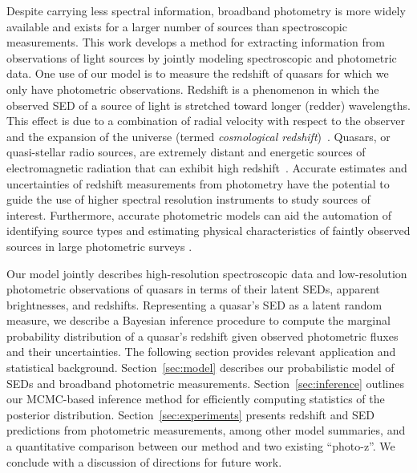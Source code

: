 \documentclass{article} %
\begin{document}
Despite carrying less spectral information, broadband photometry is more widely available and exists for a larger number of sources than spectroscopic measurements. 
This work develops a method for extracting information from observations of light sources by jointly modeling spectroscopic and photometric data.  
One use of our model is to measure the redshift of quasars for which we only have photometric observations.  
Redshift is a phenomenon in which the observed SED of a source of light is stretched toward longer (redder) wavelengths.
This effect is due to a combination of radial velocity with respect to the observer and the expansion of the universe (termed \emph{cosmological redshift})~\cite{hogg1999distance, harrison1993redshift}.  
Quasars, or quasi-stellar radio sources, are extremely distant and energetic sources of electromagnetic radiation that can exhibit high redshift~\cite{silk1997quasars}.  
Accurate estimates and uncertainties of redshift measurements from photometry have the potential to guide the use of higher spectral resolution instruments to study sources of interest.  
Furthermore, accurate photometric models can aid the automation of identifying source types and estimating physical characteristics of faintly observed sources in large photometric surveys \cite{regier2015}.  

Our model jointly describes high-resolution spectroscopic data and low-resolution photometric observations of quasars in terms of their latent SEDs, apparent brightnesses, and redshifts. 
Representing a quasar's SED as a latent random measure, we describe a Bayesian inference procedure to compute the marginal probability distribution of a quasar's redshift given observed photometric fluxes and their uncertainties.  
The following section provides relevant application and statistical background.  
Section~\ref{sec:model} describes our probabilistic model of SEDs and broadband photometric measurements.
Section~\ref{sec:inference} outlines our MCMC-based inference method for efficiently computing statistics of the posterior distribution.
Section~\ref{sec:experiments} presents redshift and SED predictions from photometric measurements, among other model summaries, and a quantitative comparison between our method and two existing ``photo-z''.  
We conclude with a discussion of directions for future work.  
\end{document}
